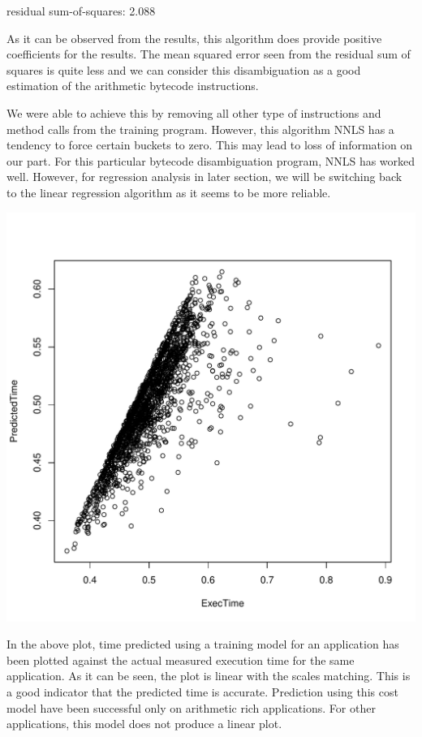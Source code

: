 \documentclass[11pt]{article}
\begin{document}
residual sum-of-squares: 2.088

As it can be observed from the results, this algorithm does provide positive coefficients for the results. The mean squared error seen from the residual sum of squares is quite less and we can consider this disambiguation as a good estimation of the arithmetic bytecode instructions. 

We were able to achieve this by removing all other type of instructions and method calls from the training program. However, this algorithm NNLS has a tendency to force certain buckets to zero. This may lead to loss of information on our part. For this particular bytecode disambiguation program, NNLS has worked well. However, for regression analysis in later section, we will be switching back to the linear regression algorithm as it seems to be more reliable.

\includegraphics[scale=0.7]{Rplots.pdf}

In the above plot, time predicted using a training model for an application has been plotted against the actual measured execution time for the same application. As it can be seen, the plot is linear with the scales matching. This is a good indicator that the predicted time is accurate. Prediction using this cost model have been successful only on arithmetic rich applications. For other applications, this model does not produce a linear plot.
\newpage
\end{document}

